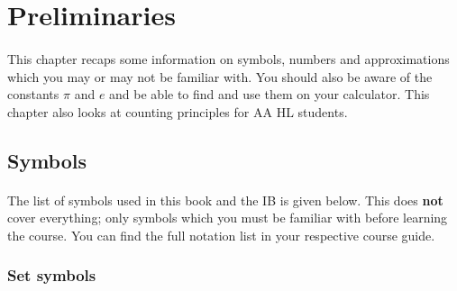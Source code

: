 \documentclass[12pt, a4paper, titlepage, twoside]{article}
\begin{document}
	\newpage
	
\section{Preliminaries}	

	\paragraph{}
	This chapter recaps some information on symbols, numbers and approximations which you may or may not be familiar with.
	You should also be aware of the constants $\pi$ and $e$ and be able to find and use them on your calculator. This chapter
	also looks at counting principles for AA HL students.
	
	\subsection{Symbols}
	
	\paragraph{}
	The list of symbols used in this book and the IB is given below. This does \textbf{not} cover everything; only symbols
	which you must be familiar with before learning the course. You can find the full notation list in your respective course guide.
	
	{\centering \subsubsection*{Set symbols}}
	
\end{document}

